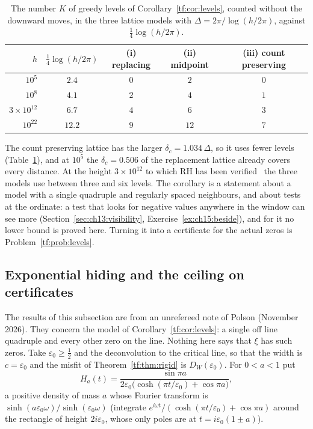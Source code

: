\begin{table}[htbp]
\centering\footnotesize
\begin{tabular}{@{}rcccc@{}}
\toprule
$h$ & $\tfrac14\log(h/2\pi)$ & (i) replacing & (ii) midpoint & (iii) count preserving\\
\midrule
$10^{5}$ & $2.4$ & $0$ & $2$ & $0$\\
$10^{8}$ & $4.1$ & $2$ & $4$ & $1$\\
$3\times10^{12}$ & $6.7$ & $4$ & $6$ & $3$\\
$10^{22}$ & $12.2$ & $9$ & $12$ & $7$\\
\bottomrule
\end{tabular}
\caption{The number $K$ of greedy levels of Corollary~\ref{tf:cor:levels}, counted without the downward moves, in the three lattice models with $\Delta=2\pi/\log(h/2\pi)$, against $\tfrac14\log(h/2\pi)$.}
\label{tf:tab:levels}
\end{table}

The count preserving lattice has the larger $\delta_c=1.034\,\Delta$, so it uses fewer levels (Table~\ref{tf:tab:levels}), and at $10^5$ the $\delta_c=0.506$ of the replacement lattice already covers every distance. At the height $3\times10^{12}$ to which RH has been verified~\cite{PT21} the three models use between three and six levels. The corollary is a statement about a model with a single quadruple and regularly spaced neighbours, and about tests at the ordinate: a test that looks for negative values anywhere in the window can see more (Section~\ref{sec:ch13:visibility}, Exercise~\ref{ex:ch15:beside}), and for it no lower bound is proved here. Turning it into a certificate for the actual zeros is Problem~\ref{tf:prob:levels}.

\subsection{Exponential hiding and the ceiling on certificates}\label{tf:sec:hiding}

The results of this subsection are from an unrefereed note of Polson (November 2026). They concern the model of Corollary~\ref{tf:cor:levels}: a single off line quadruple and every other zero on the line. Nothing here says that $\xi$ has such zeros. Take $\varepsilon_0\ge\tfrac12$ and the deconvolution to the critical line, so that the width is $c=\varepsilon_0$ and the misfit of Theorem~\ref{tf:thm:rigid} is $D_W(\varepsilon_0)$. For $0<a<1$ put
\[
H_a(t)=\frac{\sin\pi a}{2\varepsilon_0\bigl(\cosh(\pi t/\varepsilon_0)+\cos\pi a\bigr)},
\]
a positive density of mass $a$ whose Fourier transform is $\sinh(a\varepsilon_0\omega)/\sinh(\varepsilon_0\omega)$ (integrate $e^{i\omega t}/(\cosh(\pi t/\varepsilon_0)+\cos\pi a)$ around the rectangle of height $2i\varepsilon_0$, whose only poles are at $t=i\varepsilon_0(1\pm a)$).

